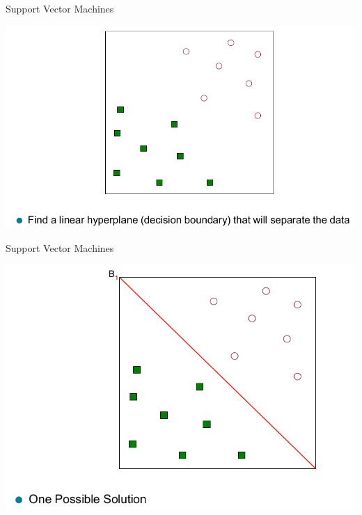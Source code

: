 \documentclass{beamer}
\begin{document}
\begin{frame}{Support Vector Machines}
    \begin{center}
        \includegraphics[scale=0.32]{svm1.png}
    \end{center}
\end{frame}
\begin{frame}{Support Vector Machines}
    \begin{center}
        \includegraphics[scale=0.32]{svm2.png}
    \end{center}
\end{frame}
\end{document}
